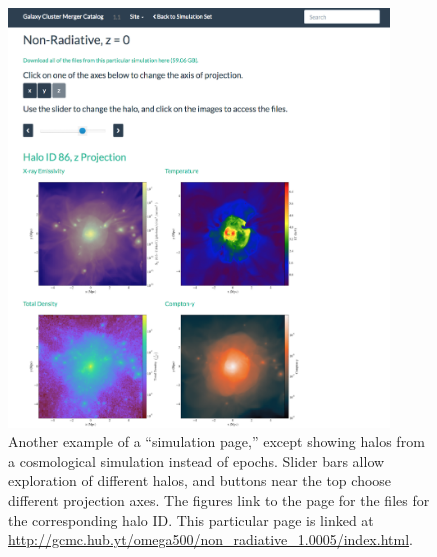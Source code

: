 \documentclass{emulateapj}
\begin{document}
\begin{figure}
  \begin{center}
  \includegraphics[width=0.9\textwidth]{halos_page.eps}
  \caption{Another example of a ``simulation page,'' except showing halos from a cosmological simulation instead of epochs. Slider bars allow exploration of different halos, and buttons near the top choose different projection axes. The figures link to the page for the files for the corresponding halo ID. This particular page is linked at \url{http://gcmc.hub.yt/omega500/non_radiative_1.0005/index.html}.\label{fig:halos_page}}
  \end{center}
  \end{figure}
  
\end{document}
